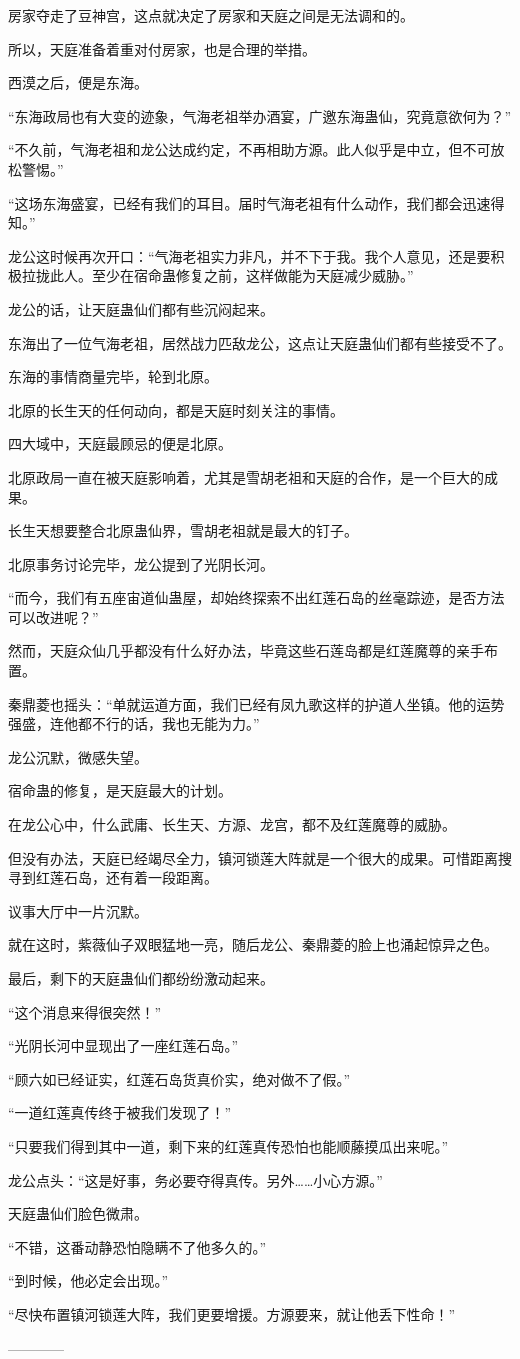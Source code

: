 \begin{this_body}
房家夺走了豆神宫，这点就决定了房家和天庭之间是无法调和的。

所以，天庭准备着重对付房家，也是合理的举措。

西漠之后，便是东海。

“东海政局也有大变的迹象，气海老祖举办酒宴，广邀东海蛊仙，究竟意欲何为？”

“不久前，气海老祖和龙公达成约定，不再相助方源。此人似乎是中立，但不可放松警惕。”

“这场东海盛宴，已经有我们的耳目。届时气海老祖有什么动作，我们都会迅速得知。”

龙公这时候再次开口：“气海老祖实力非凡，并不下于我。我个人意见，还是要积极拉拢此人。至少在宿命蛊修复之前，这样做能为天庭减少威胁。”

龙公的话，让天庭蛊仙们都有些沉闷起来。

东海出了一位气海老祖，居然战力匹敌龙公，这点让天庭蛊仙们都有些接受不了。

东海的事情商量完毕，轮到北原。

北原的长生天的任何动向，都是天庭时刻关注的事情。

四大域中，天庭最顾忌的便是北原。

北原政局一直在被天庭影响着，尤其是雪胡老祖和天庭的合作，是一个巨大的成果。

长生天想要整合北原蛊仙界，雪胡老祖就是最大的钉子。

北原事务讨论完毕，龙公提到了光阴长河。

“而今，我们有五座宙道仙蛊屋，却始终探索不出红莲石岛的丝毫踪迹，是否方法可以改进呢？”

然而，天庭众仙几乎都没有什么好办法，毕竟这些石莲岛都是红莲魔尊的亲手布置。

秦鼎菱也摇头：“单就运道方面，我们已经有凤九歌这样的护道人坐镇。他的运势强盛，连他都不行的话，我也无能为力。”

龙公沉默，微感失望。

宿命蛊的修复，是天庭最大的计划。

在龙公心中，什么武庸、长生天、方源、龙宫，都不及红莲魔尊的威胁。

但没有办法，天庭已经竭尽全力，镇河锁莲大阵就是一个很大的成果。可惜距离搜寻到红莲石岛，还有着一段距离。

议事大厅中一片沉默。

就在这时，紫薇仙子双眼猛地一亮，随后龙公、秦鼎菱的脸上也涌起惊异之色。

最后，剩下的天庭蛊仙们都纷纷激动起来。

“这个消息来得很突然！”

“光阴长河中显现出了一座红莲石岛。”

“顾六如已经证实，红莲石岛货真价实，绝对做不了假。”

“一道红莲真传终于被我们发现了！”

“只要我们得到其中一道，剩下来的红莲真传恐怕也能顺藤摸瓜出来呢。”

龙公点头：“这是好事，务必要夺得真传。另外……小心方源。”

天庭蛊仙们脸色微肃。

“不错，这番动静恐怕隐瞒不了他多久的。”

“到时候，他必定会出现。”

“尽快布置镇河锁莲大阵，我们更要增援。方源要来，就让他丢下性命！”

------------

\end{this_body}

